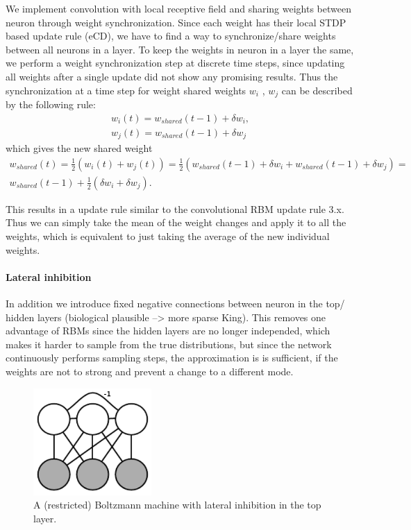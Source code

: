 We implement convolution with local receptive field and sharing weights between neuron through weight synchronization.
Since each weight has their local STDP based update rule (eCD), we have to find a way to synchronize/share weights between all neurons in a layer.
To keep the weights in neuron in a layer the same, we perform a weight synchronization step at discrete time steps, since updating all weights after a single update did not show any promising results.
Thus the synchronization at a time step for weight shared weights $w_i$ , $w_j$ can be described by the following rule:  
\[
\begin{split}
w_i(t) = w_{shared}(t-1) + \delta w_i, \\ 
w_j(t) = w_{shared}(t-1) + \delta w_j 
\end{split}
\]
which gives the new shared weight
\[
\begin{split}
w_{shared}(t) = \frac{1}{2} (w_i(t) + w_j(t) ) = \frac{1}{2} (w_{shared}(t-1) + \delta w_i + w_{shared}(t-1) + \delta w_j) = \\ w_{shared}(t-1) + \frac{1}{2} (\delta w_i + \delta w_j).
\end{split}
\]

This results in a update rule similar to the convolutional RBM update rule 3.x.
Thus we can simply take the mean of the weight changes and apply it to all the weights, which is equivalent to just taking the average of the new individual weights. 

\paragraph{Lateral inhibition}
In addition we introduce fixed negative connections between neuron in the top/ hidden layers (biological plausible --> more sparse King).
This removes one advantage of RBMs since the hidden layers are no longer independed, which makes it harder to sample from the true distributions, but since the network continuously performs sampling steps, the approximation is is sufficient, if the weights are not to strong and prevent a change to a different mode.

\begin{figure}
	\centering
    	\includegraphics[width=0.4\textwidth]{imgs/lateral_inhib.png} 
    \caption{A (restricted) Boltzmann machine with lateral inhibition in the top layer.}
	\label{fig:bminhib}
\end{figure}


